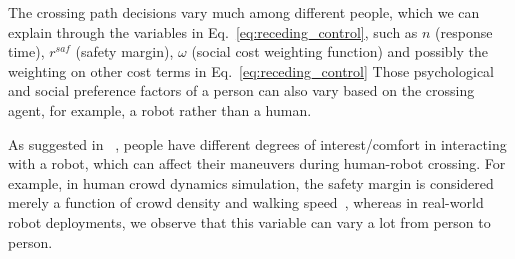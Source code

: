 \documentclass[conference]{IEEEtran}
\begin{document}




The crossing path decisions vary much among different people, 
which we can explain through the variables in Eq.~\ref{eq:receding_control}, such as 
$n$ (response time), $r^{saf}$ (safety margin), $\omega$ (social cost 
weighting function)
and possibly the weighting on other cost terms in Eq.~\ref{eq:receding_control}
Those psychological 
and social preference factors of a person can also vary based on the crossing
agent, for example, a robot rather than a human.

As suggested in ~\cite{hansen2009adaptive},
people have different degrees of interest/comfort in interacting with a robot, which 
can affect their maneuvers during human-robot crossing. For 
example, in human crowd dynamics simulation, the safety margin is considered 
merely a function of crowd density and walking speed~\cite{helbing1995social},
whereas in real-world robot deployments, we observe that this variable can vary a lot from person to person.
\end{document}
